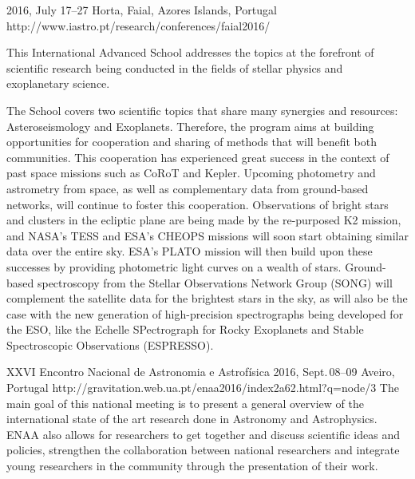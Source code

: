 {2016, July 17--27}%
{Horta, Faial, Azores Islands, Portugal}%
{http://www.iastro.pt/research/conferences/faial2016/}%
{}%
{This International Advanced School addresses the topics at the forefront of scientific research being conducted in the fields of stellar physics and exoplanetary science.

The School covers two scientific topics that share many synergies and resources: Asteroseismology and Exoplanets.
Therefore, the program aims at building opportunities for cooperation and sharing of methods that will benefit both communities.
This cooperation has experienced great success in the context of past space missions such as CoRoT and Kepler.
Upcoming photometry and astrometry from space, as well as complementary data from ground-based networks, will continue to foster this cooperation.
Observations of bright stars and clusters in the ecliptic plane are being made by the re-purposed K2 mission, and NASA's TESS and ESA's CHEOPS missions will soon start obtaining similar data over the entire sky.
ESA's PLATO mission will then build upon these successes by providing photometric light curves on a wealth of stars.
Ground-based spectroscopy from the Stellar Observations Network Group (SONG) will complement the satellite data for the brightest stars in the sky, as will also be the case with the new generation of high-precision spectrographs being developed for the ESO, like the Echelle SPectrograph for Rocky Exoplanets and Stable Spectroscopic Observations (ESPRESSO).}%

 {XXVI Encontro Nacional de Astronomia e Astrofísica}%
{2016, Sept.\,08--09}%
{Aveiro, Portugal}%
{http://gravitation.web.ua.pt/enaa2016/index2a62.html?q=node/3}%
{}%
{The main goal of this national meeting is to present a general overview of the international state of the art research done in Astronomy and Astrophysics.
    ENAA also allows for researchers to get together and discuss scientific ideas and policies, strengthen the collaboration between national researchers and integrate young researchers in the community through the presentation of their work.}


